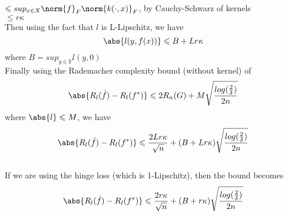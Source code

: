 \documentclass{article}
\begin{document}
$\leqslant sup_{x \in X} \norm{f}_{F} \norm{k(\cdot,x)}_{F}$, by Cauchy-Schwarz of kernels\\

$\leqslant r\kappa $ \\

Then using the fact that $l$ is L-Lipschitz, we have $$\abs{l(y,f(x))} \leqslant B+Lr\kappa$$ where $B=sup_{y\in Y} l(y,0)$ \\

Finally using the Rademacher complexity bound (without kernel) of $$\abs{R_{l}(\hat{f})-R_{l}(f^*)} \leqslant 2R_n(G)+M\sqrt{ \frac{ log(\frac{2}{\delta})}{2n}}$$  where $\abs{l} \leqslant M$, we have $$\abs{R_{l}(\hat{f})-R_{l}(f^*)} \leqslant \frac{2Lr\kappa}{\sqrt{n}} + (B+Lr\kappa) \sqrt{ \frac{ log(\frac{2}{\delta})}{2n} }$$ \\

If we are using the hinge loss (which is 1-Lipschitz), then the bound becomes $$\abs{R_{l}(\hat{f})-R_{l}(f^*)} \leqslant \frac{2r\kappa}{\sqrt{n}} + (B+r\kappa) \sqrt{ \frac{ log(\frac{2}{\delta})}{2n} }$$
\end{document}
